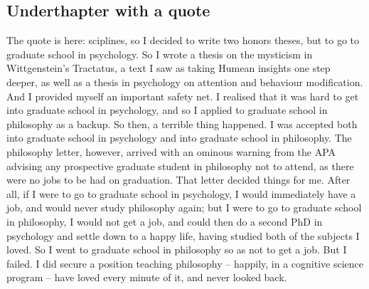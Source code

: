 \documentclass[article,letterpaper,times,12pt,listings-bw,microtype]{memoir}
\begin{document}
\subsection{Underthapter with a quote}
\label{sec-1-2}

The quote is here: sciplines, so I decided to write two honors theses, but to go to graduate school in psychology. So I wrote a thesis on the mysticism in Wittgenstein’s Tractatus, a text I saw as taking Humean insights one step deeper, as well as a thesis in psychology on attention and behaviour modification. And I provided myself an important safety net. I realised that it was hard to get into graduate school in psychology, and so I applied to graduate school in philosophy as a backup. So then, a terrible thing happened. I was accepted both into graduate school in psychology and into graduate school in philosophy. The philosophy letter, however, arrived with an ominous warning from the APA advising any prospective graduate student in philosophy not to attend, as there were no jobs to be had on graduation. That letter decided things for me. After all, if I were to go to graduate school in psychology, I would immediately have a job, and would never study philosophy again; but I were to go to graduate school in philosophy, I would not get a job, and could then do a second PhD in psychology and settle down to a happy life, having studied both of the subjects I loved. So I went to graduate school in philosophy so as not to get a job. But I failed. I did secure a position teaching philosophy – happily, in a cognitive science program – have loved every minute of it, and never looked back.
\end{document}
